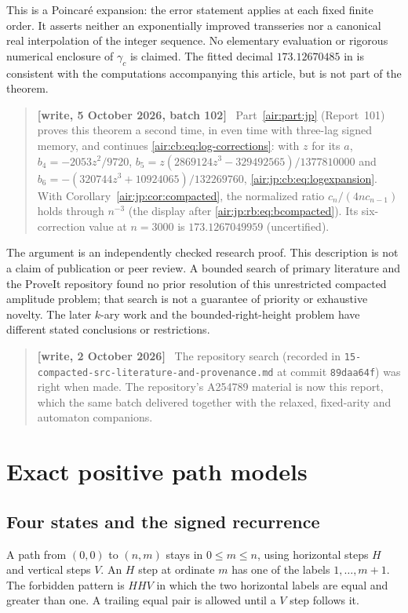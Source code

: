 \documentclass[11pt,letterpaper]{article}
\numberwithin{equation}{section}
\theoremstyle{remark}
\newenvironment{writenote}{\par\smallskip\begin{quote}\small\textbf{[write, 2 October 2026]}\ }{\end{quote}\smallskip}
\newenvironment{writenotejp}{\par\smallskip\begin{quote}\small\textbf{[write, 5 October 2026, batch 102]}\ }{\end{quote}\smallskip}
\newcommand{\repopath}[1]{\nolinkurl{#1}}
\begin{document}
This is a Poincar\'e expansion: the error statement applies at each fixed
finite order. It asserts neither an exponentially improved transseries nor a
canonical real interpolation of the integer sequence. No elementary evaluation
or rigorous numerical enclosure of $\gamma_c$ is claimed. The fitted decimal
$173.12670485$ in \cite{epfw} is consistent with the computations accompanying
this article, but is not part of the theorem.
\begin{writenotejp}
Part~\ref{air:part:jp} (Report~101) proves this theorem a second time, in even time with three-lag signed memory, and continues \eqref{air:cb:eq:log-corrections}: with $z$ for its $a$, $b_4=-2053z^2/9720$, $b_5=z(2869124z^3-329492565)/1377810000$ and $b_6=-(320744z^3+10924065)/132269760$, \eqref{air:jp:cb:eq:logexpansion}. With Corollary~\ref{air:jp:cor:compacted}, the normalized ratio $c_n/(4nc_{n-1})$ holds through $n^{-3}$ (the display after \eqref{air:jp:rb:eq:bcompacted}). Its six-correction value at $n=3000$ is $173.1267049959$ (uncertified).
\end{writenotejp}

The argument is an independently checked research proof. This description is
not a claim of publication or peer review. A bounded search of primary
literature and the ProveIt repository found no prior resolution of this
unrestricted compacted amplitude problem; that search is not a guarantee of
priority or exhaustive novelty. The later $k$-ary work \cite{gdw} and the
bounded-right-height problem \cite{ggkw} have different stated conclusions
or restrictions.
\begin{writenote}
The repository search (recorded in \repopath{15-compacted-src-literature-and-provenance.md} at commit \texttt{89daa64f}) was right when made. The repository's A254789 material is now this report, which the same batch delivered together with the relaxed, fixed-arity and automaton companions.
\end{writenote}


\section{Exact positive path models}

\subsection{Four states and the signed recurrence}
A path from $(0,0)$ to $(n,m)$ stays in $0\le m\le n$, using horizontal
steps $H$ and vertical steps $V$. An $H$ step at ordinate $m$ has one of the
labels $1,\ldots,m+1$. The forbidden pattern is $HHV$ in which the two
horizontal labels are equal and greater than one. A trailing equal pair is
allowed until a $V$ step follows it.
\end{document}
